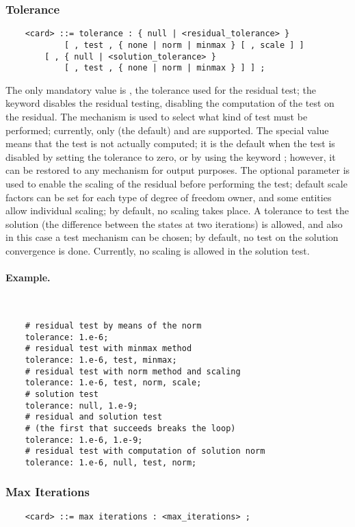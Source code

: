 \subsubsection{Tolerance}\label{sec:IVP:TOLERANCE}
\begin{verbatim}
    <card> ::= tolerance : { null | <residual_tolerance> }
            [ , test , { none | norm | minmax } [ , scale ] ]
        [ , { null | <solution_tolerance> } 
            [ , test , { none | norm | minmax } ] ] ;
\end{verbatim}
The only mandatory value is , 
the tolerance used for the residual test; the keyword 
disables the residual testing, disabling the computation
of the test on the residual.
The  mechanism is used to select what kind of test must
be performed; currently, only  (the default) 
and  are supported.
The special value  means that the test is not actually 
computed; it is the default when the test is disabled by setting
the tolerance to zero, or by using the keyword ;
however, it can be restored to any mechanism for output purposes.
The optional parameter  is used to enable the scaling
of the residual before performing the test; default scale factors 
can be set for each type of degree of freedom owner, and some
entities allow individual scaling; by default, no scaling takes place.
A tolerance  to test the solution 
(the difference between the states at two iterations) is allowed, 
and also in this case a test mechanism can be chosen;
by default, no test on the solution convergence is done.
Currently, no scaling is allowed in the solution test.

\noindent
\paragraph{Example.} \
\begin{verbatim}
    # residual test by means of the norm
    tolerance: 1.e-6;
    # residual test with minmax method
    tolerance: 1.e-6, test, minmax;
    # residual test with norm method and scaling
    tolerance: 1.e-6, test, norm, scale;
    # solution test
    tolerance: null, 1.e-9;
    # residual and solution test
    # (the first that succeeds breaks the loop)
    tolerance: 1.e-6, 1.e-9;
    # residual test with computation of solution norm
    tolerance: 1.e-6, null, test, norm;
\end{verbatim}

\subsubsection{Max Iterations}
\begin{verbatim}
    <card> ::= max iterations : <max_iterations> ;
\end{verbatim}

